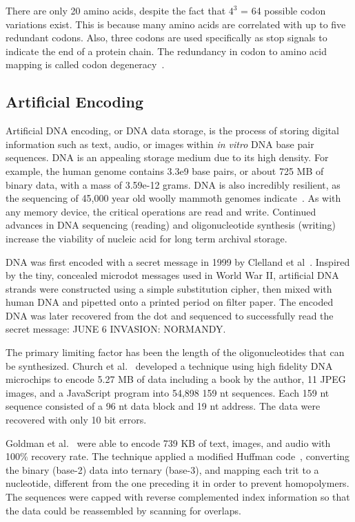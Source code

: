 \documentclass{bioinfo}
\begin{document}
There are only 20 amino acids, despite the fact that $4^3$ = 64 possible codon variations exist. This is because many amino acids are correlated with up to five redundant codons. Also, three codons are used specifically as stop signals to indicate the end of a protein chain. The redundancy in codon to amino acid mapping is called codon degeneracy~\cite{WBBGLL2008}.


\subsection{Artificial Encoding}

Artificial DNA encoding, or DNA data storage, is the process of storing digital information such as text, audio, or images within \textit{in vitro} DNA base pair sequences. DNA is an appealing storage medium due to its high density. For example, the human genome contains 3.3e9 base pairs, or about 725 MB of binary data, with a mass of 3.59e-12 grams. DNA is also incredibly resilient, as the sequencing of 45,000 year old woolly mammoth genomes indicate~\cite{PALKOPOULOU2015}. As with any memory device, the critical operations are read and write. Continued advances in DNA sequencing (reading) and oligonucleotide synthesis (writing) increase the viability of nucleic acid for long term archival storage.

DNA was first encoded with a secret message in 1999 by Clelland et al~\cite{CRB1999N}. Inspired by the tiny, concealed microdot messages used in World War II, artificial DNA strands were constructed using a simple substitution cipher, then mixed with human DNA and pipetted onto a printed period on filter paper. The encoded DNA was later recovered from the dot and sequenced to successfully read the secret message: JUNE 6 INVASION: NORMANDY.

The primary limiting factor has been the length of the oligonucleotides that can be synthesized. Church et al.~\cite{CHURCH2012} developed a technique using high fidelity DNA microchips to encode 5.27 MB of data including a book by the author, 11 JPEG images, and a JavaScript program into 54,898 159 nt sequences. Each 159 nt sequence consisted of a 96 nt data block and 19 nt address. The data were recovered with only 10 bit errors.

Goldman et al.~\cite{GOLDMAN2013} were able to encode 739 KB of text, images, and audio with 100\% recovery rate. The technique applied a modified Huffman code~\cite{H1952POTIRE}, converting the binary (base-2) data into ternary (base-3), and mapping each trit to a nucleotide, different from the one preceding it in order to prevent homopolymers. The sequences were capped with reverse complemented index information so that the data could be reassembled by scanning for overlaps.
\end{document}
